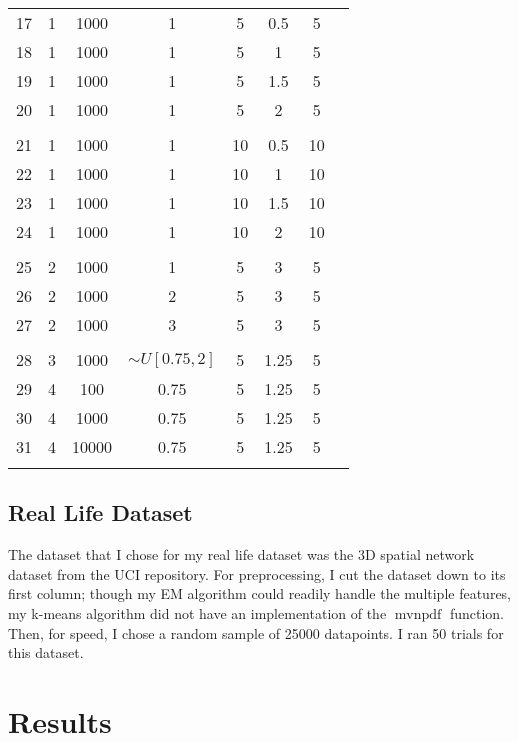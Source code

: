 \documentclass{journal}
\DeclareMathOperator{\mvnpdf}{mvnpdf}
\begin{document}
\begin{table}[hp]
\begin{tabular}{lccccccc}
    17 & 1 & 1000 & 1 & 5 & 0.5 & 5 \\ %
    18 & 1 & 1000 & 1 & 5 & 1 & 5 \\ %
    19 & 1 & 1000 & 1 & 5 & 1.5 & 5 \\ %
    20 & 1 & 1000 & 1 & 5 & 2 & 5 \\ \\ %

    21 & 1 & 1000 & 1 & 10 & 0.5 & 10 \\ %
    22 & 1 & 1000 & 1 & 10 & 1 & 10 \\ %
    23 & 1 & 1000 & 1 & 10 & 1.5 & 10 \\ %
    24 & 1 & 1000 & 1 & 10 & 2 & 10 \\ \\ %


    25 & 2 & 1000 & 1 & 5 & 3 & 5 \\ %
    26 & 2 & 1000 & 2 & 5 & 3 & 5 \\ %
    27 & 2 & 1000 & 3 & 5 & 3 & 5 \\ \\ %

    28 & 3 & 1000 & $\sim{} U[0.75, 2]$ & 5 & 1.25 & 5 \\ %

    29 & 4 & 100 & 0.75 & 5 & 1.25 & 5 \\ %
    30 & 4 & 1000 & 0.75 & 5 & 1.25 & 5 \\ %
    31 & 4 & 10000 & 0.75 & 5 & 1.25 & 5 \\ \\ %
\end{tabular}
\end{table}

\subsection{Real Life Dataset}
The dataset that I chose for my real life dataset was the 3D spatial network
dataset from the UCI repository. For preprocessing, I cut the dataset down to
its first column; though my EM algorithm could readily handle the multiple
features, my k-means algorithm did not have an implementation of the
$\mvnpdf{}$ function. Then, for speed, I chose a random sample of 25000
datapoints. I ran 50 trials for this dataset.

\section{Results}\label{sec:results}
\end{document}
